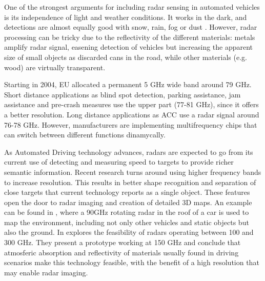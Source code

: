 One of the strongest arguments for including radar sensing in automated 
vehicles is its independence of light and weather conditions. 
It works in the dark, and detections are almost equally good with snow, 
rain, fog or dust \cite{Reina2015}.
However, radar processing can be tricky due to the reflectivity of the
different materials: metals amplify radar signal, easening detection of 
vehicles but increasing the apparent size of small objects as discarded cans
in the road, while other materials (e.g. wood) are virtually transparent.

Starting in 2004, EU allocated a permanent 5 GHz wide band around 79 GHz. Short 
distance applications as blind spot detection, parking assistance, jam 
assistance and pre-crash measures use the upper part (77-81 GHz), since it 
offers a better resolution. Long distance applications as ACC use a radar 
signal around 76-78 GHz. However, manufacturers are implementing multifrequency 
chips that can switch between different functions dinamycally.

As Automated Driving technology advances, radars are expected to go from its
current use of detecting and measuring speed to targets to provide richer
semantic information. 
Recent research turns around using higher frequency bands to increase
resolution. This results in better shape recognition and separation of close
targets that current technology reports as a single object.
These features open the door to radar imaging and creation of detailed 3D maps. 
An example can be found in \cite{Reina2015}, where a 90GHz rotating radar in
the roof of a car is used to map the environment, including not only other
vehicles and static objects but also the ground.
In \cite{Kohler2013} explores the feasibility of radars operating between 
100 and 300 GHz. They present a prototype working at 150 GHz and conclude 
that atmosferic absorption and reflectivity of materials usually found in 
driving scenarios make this technology feasible, with the benefit of a high
resolution that may enable radar imaging.



